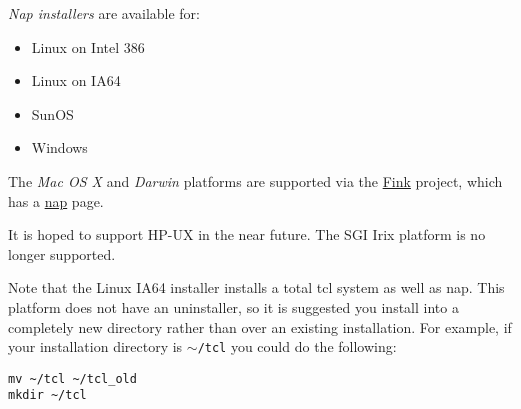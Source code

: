   \emph{Nap installers} are available for:
  \begin{itemize}
    \item Linux on Intel 386
    \item Linux on IA64
    \item SunOS
    \item Windows
  \end{itemize}
  \par The 
  \emph{Mac OS X} and 
  \emph{Darwin} platforms are supported via the 
  \href{http://fink.sourceforge.net}{Fink} project, which has a 
  \href{http://fink.sourceforge.net/pdb/package.php/nap}{nap}
  page.
  \par It is hoped to support HP-UX in the near future. The SGI Irix
  platform is no longer supported.
  \par Note that the Linux IA64 installer installs a total tcl system as
  well as nap. This platform does not have an uninstaller, so it is
  suggested you install into a completely new directory rather than
  over an existing installation. For example, if your installation
  directory is 
  \texttt{$\sim$/tcl} you could do the following:
  \begin{verbatim}
mv ~/tcl ~/tcl_old
mkdir ~/tcl
\end{verbatim}

